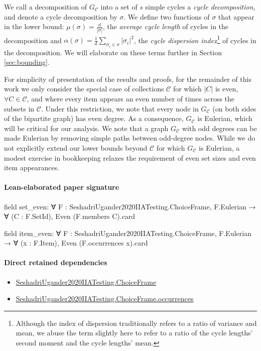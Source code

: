 \documentclass[10pt]{article}
\begin{document}
\begin{ReviewVerbatim}
	We call a decomposition of $G_\mathcal{C}$ into a set of $s$ simple cycles a {\it cycle decomposition}, and denote a cycle decomposition by $\sigma$. We define two functions of $\sigma$ that appear in the lower bound: $\mu(\sigma) = \frac{d}{|\sigma|}$, the \textit{average cycle length} of cycles in the decomposition and $\alpha(\sigma) = \frac{1}{d}\sum_{\sigma_i \in \sigma} |\sigma_i|^2$, the \textit{cycle dispersion index}\footnote{Although the index of dispersion traditionally refers to a ratio of variance and mean, we abuse the term slightly here to refer to a ratio of the cycle lengths' second moment and the cycle lengths' mean.} of cycles in the decomposition. We will elaborate on these terms further in Section \ref{sec:bounding}.

	For simplicity of presentation of the results and proofs, for the remainder of this work we only consider the special case of collections $\mathcal{C}$ for which $|C|$ is even, $\forall C \in \mathcal{C}$, and where every item appears an even number of times across the subsets in $\mathcal{C}$. Under this restriction, we note that every node in $G_\mathcal{C}$ (on both sides of the bipartite graph) has even degree. As a consequence, $G_\mathcal{C}$ is Eulerian, which will be critical for our analysis.
	We note that a graph $G_\mathcal{C}$ with odd degrees can be made Eulerian by removing simple paths between odd-degree nodes. While we do not explicitly extend our lower bounds beyond $\mathcal C$ for which $G_\mathcal{C}$ is Eulerian, a modest exercise in bookkeeping relaxes the requirement of even set sizes and even item appearances.
\end{ReviewVerbatim}



\paragraph{Lean-elaborated paper signature}
\begin{ReviewVerbatim}
field set_even:
∀ {F : SeshadriUgander2020IIATesting.ChoiceFrame}, F.Eulerian → ∀ (C : F.SetId), Even (F.members C).card

field item_even:
∀ {F : SeshadriUgander2020IIATesting.ChoiceFrame}, F.Eulerian → ∀ (x : F.Item), Even (F.occurrences x).card
\end{ReviewVerbatim}

\paragraph{Direct retained dependencies}
\begin{itemize}\raggedright
\item \hyperlink{paper-prerequisite-0b24d39c6f4d1898}{Seshadri\allowbreak{}Ugander2020\allowbreak{}IIA\allowbreak{}Testing.\allowbreak{}Choice\allowbreak{}Frame}
\item \hyperlink{governing-declaration-23f7eaa033eecf10}{Seshadri\allowbreak{}Ugander2020\allowbreak{}IIA\allowbreak{}Testing.\allowbreak{}Choice\allowbreak{}Frame.\allowbreak{}occurrences}
\end{itemize}
\end{document}
